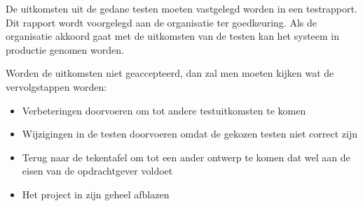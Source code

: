 De uitkomsten uit de gedane testen moeten vastgelegd worden in een testrapport. Dit rapport wordt voorgelegd aan de organisatie ter goedkeuring. Als de organisatie akkoord gaat met de uitkomsten van de testen kan het systeem in productie genomen worden.

Worden de uitkomsten niet geaccepteerd, dan zal men moeten kijken wat de vervolgstappen worden:
\begin{itemize}
\item Verbeteringen doorvoeren om tot andere testuitkomsten te komen
\item Wijzigingen in de testen doorvoeren omdat de gekozen testen niet correct zijn
\item Terug naar de tekentafel om tot een ander ontwerp te komen dat wel aan de eisen van de opdrachtgever voldoet
\item Het project in zijn geheel afblazen
\end{itemize}
